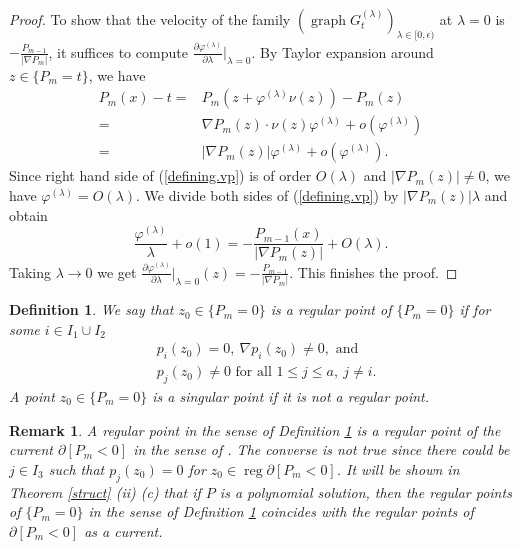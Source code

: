 \documentclass[pdflatex,sn-mathphys-num]{sn-jnl}%
\theoremstyle{thmstyleone}%
\theoremstyle{thmstyletwo}%
\newtheorem{remark}{Remark}%
\theoremstyle{thmstylethree}%
\newtheorem{definition}{Definition}%
\newcommand{\vp}{\varphi}
\DeclareMathOperator{\reg}{reg}
\DeclareMathOperator{\graph}{graph}
\begin{document}
\begin{proof}
To show that the velocity of the family $(\graph G_t^{(\lambda)})_{\lambda\in [0,\epsilon)}$ at $\lambda=0$ is $-\frac{P_{m-1}}{|\nabla P_m|}$, it suffices to compute $\frac{\partial \vp^{(\lambda)}}{\partial \lambda}|_{\lambda=0}$. By Taylor expansion around $z\in \{P_m=t\}$, we have
\[\begin{aligned}
	P_m(x)-t=&P_m(z+\vp^{(\lambda)}\nu(z))-P_m(z)\\
	=&\nabla P_m(z)\cdot\nu(z)\vp^{(\lambda)}+o(\vp^{(\lambda)})\\
	=&|\nabla P_m(z)|\vp^{(\lambda)}+o(\vp^{(\lambda)}).
\end{aligned}\]
Since right hand side of (\ref{defining.vp}) is of order $O(\lambda)$ and $|\nabla P_m(z)|\neq0$, we have $\vp^{(\lambda)}=O(\lambda)$.
We divide both sides of (\ref{defining.vp}) by $|\nabla P_m(z)|\lambda$ and obtain
\[\frac{\vp^{(\lambda)}}{\lambda}+o(1)=-\frac{P_{m-1}(x)}{|\nabla P_m(z)|}+O(\lambda).\]
Taking $\lambda\to0$ we get $\frac{\partial \vp^{(\lambda)}}{\partial \lambda}|_{\lambda=0}(z)=-\frac{P_{m-1}}{|\nabla P_m|}$. This finishes the proof.
\end{proof}



\begin{definition}\label{regular.point}
 	We say that $z_0\in \{P_m=0\}$ is a \textit{regular point} of $\{P_m=0\}$ if for some $ i\in I_1\cup I_2$
	\begin{equation}
		\label{regular}\begin{aligned}
			&p_i(z_0)=0,\ \nabla p_i(z_0)\neq 0,\text{ and}\\
			&p_j(z_0)\neq 0\text{ for all }1\le j\le a,\ j\neq i.
		\end{aligned} 
	\end{equation}
	A point $z_0\in \{P_m=0\}$ is a \textit{singular point} if it is not a regular point.
\end{definition}
\begin{remark}
	 A regular point in the sense of Definition \ref{regular.point} is a regular point of the current $\partial [P_m<0]$ in the sense of \cite[5.3.17]{Fed}. The converse is not true since there could be $j\in I_3$ such that $p_j(z_0)=0$ for $z_0\in \reg \partial [P_m<0]$. It will be shown in Theorem \ref{struct} (ii) (c) that if $P$ is a polynomial solution, then the regular points of $\{P_m=0\}$ in the sense of Definition \ref{regular.point} coincides with the regular points of $\partial[P_m<0]$ as a current.
\end{remark}
\end{document}
